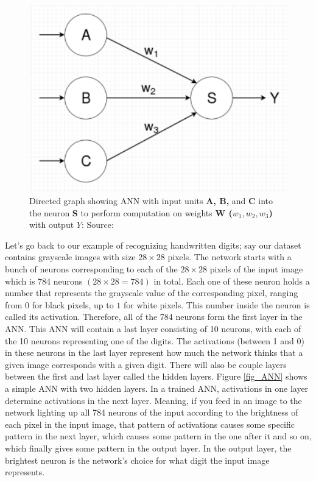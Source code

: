 \documentclass[master]{thesis-uestc}
\begin{document}
\begin{figure}[ht]
\includegraphics[width=5in]{pic/neuron.png}
\caption{Directed graph showing ANN with input units \textbf{A, B,} and \textbf{C} into the neuron \textbf{S} to perform computation on weights \textbf{W ($w_1, w_2, w_3$)} with output \textbf{$Y$}: Source:\cite{McGonagle}}
\label{fig_neuron}
\end{figure}

Let's go back to our example of recognizing handwritten digits; say our dataset contains grayscale images with size $28 \times 28$ pixels. The network starts with a bunch of neurons corresponding to each of the $28 \times 28$ pixels of the input image which is 784 neurons $(28 \times 28 = 784)$ in total. Each one of these neuron holds a number that represents the grayscale value of the corresponding pixel, ranging from $0$ for black pixels, up to $1$ for white pixels. This number inside the neuron is called its activation. Therefore, all of the 784 neurons form the first layer in the ANN. This ANN will contain a last layer consisting of 10 neurons, with each of the 10 neurons representing one of the digits. The activations (between 1 and 0) in these neurons in the last layer represent how much the network thinks that a given image corresponds with a given digit. There will also be couple layers between the first and last layer called the hidden layers. Figure \ref{fig_ANN} shows a simple ANN with two hidden layers. In a trained ANN, activations in one layer determine activations in the next layer. Meaning, if you feed in an image to the network lighting up all 784 neurons of the input according to the brightness of each pixel in the input image, that pattern of activations causes some specific pattern in the next layer, which causes some pattern in the one after it and so on, which finally gives some pattern in the output layer. In the output layer, the brightest neuron is the network's choice for what digit the input image represents.
\end{document}
